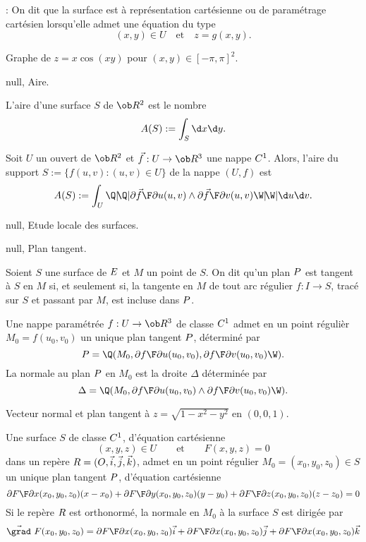 \Remarque : On dit que la surface est à représentation cartésienne ou de paramétrage cartésien 
lorsqu'elle admet une équation du type 
$$
(x,y)\in U\quad\mbox{et}\quad z=g(x,y).
$$

\centerline{%
}%
\Figure [Index=Surfaces!Representation Cartesienne@Représentation Cartésienne] Graphe de $z=x\cos(xy)$ pour $(x,y)\in[-\pi,\pi]^2$.

\Subsection null, Aire.
\bigskip

 L'aire d'une surface $S$ de $\ob R^2$ 
est le nombre
$$
\sc A(S):=\int_S\d x\d y. 
$$

 Soit $U$ un ouvert de $\ob R^2$ et 
$\vec f:U\to\ob R^3$ 
une nappe $\sc C^1$. Alors, l'aire du support $S:=\{f(u,v):(u,v)\in U\}$ 
de la nappe $(U,f)$ est 
$$
\sc A(S):=\int_U\Q|\!\Q|{\partial \vec f\F\partial u}(u,v)\wedge{\partial\vec f\F\partial v}(u,v)\W|\!\W|\d u\d v. 
$$
\smallskip

\Section null, Etude locale des surfaces.

\Subsection null, Plan tangent.
\bigskip

\Definition [] Soient $S$ une surface de $\sc E$ et $M$ un point de $S$. \pn
On dit qu'un plan $\sc P$ est tangent à $S$ en $M$ si, et seulement si, 
la tangente en $M$ de tout arc régulier $f:I\to S$, tracé sur $S$ 
et passant par $M$, est incluse dans $\sc P$. 
\bigskip

\Theoreme [] Une nappe paramétrée $f:U\to\ob R^3$ de classe $\sc C^1$ admet 
en un point régulièr $M_0=f(u_0,v_0)$ un unique plan tangent $\sc P$, 
déterminé par 
$$
\sc P=\Q(M_0,{\partial f\F\partial u}(u_0,v_0),{\partial f\F\partial v}(u_0,v_0)\W).
$$
La normale au plan $\sc P$ en $M_0$ est la droite $\Delta$ déterminée par 
$$
\Delta=\Q(M_0,{\partial f\F\partial u}(u_0,v_0)\wedge{\partial f\F\partial v}(u_0,v_0)\W).
$$


\centerline{%
}%
\Figure [Index=Surfaces!Plant tangent]  Vecteur normal et plan tangent à $z=\sqrt{1-x^2-y^2}$ en $(0,0,1)$.
\bigskip

\Theoreme [] Une surface $S$ de classe $\sc C^1$, d'équation cartésienne 
$$
(x,y,z)\in U\qquad\mbox{et}\qquad F(x,y,z)=0
$$
dans un repère $\sc R=(O,\vec i,\vec j,\vec k)$, 
admet en un point régulier $M_0=(x_0,y_0,z_0)\in S$ un unique plan tangent $\sc P$, 
d'équation cartésienne 
$$
{\partial F\F\partial x}(x_0,y_0,z_0)(x-x_0)+{\partial F\F\partial y}(x_0,y_0,z_0)(y-y_0)
+{\partial F\F\partial z}(x_0,y_0,z_0)(z-z_0)=0
$$
Si le repère $\sc R$ est orthonormé, la normale en $M_0$ à la surface $S$ 
est dirigée par
$$
\vec{\grad}\ F(x_0,y_0,z_0)={\partial F\F\partial x}(x_0,y_0,z_0)\vec i+{\partial F\F\partial x}(x_0,y_0,z_0)\vec j
+{\partial F\F\partial x}(x_0,y_0,z_0)\vec k
$$ 
\medskip

